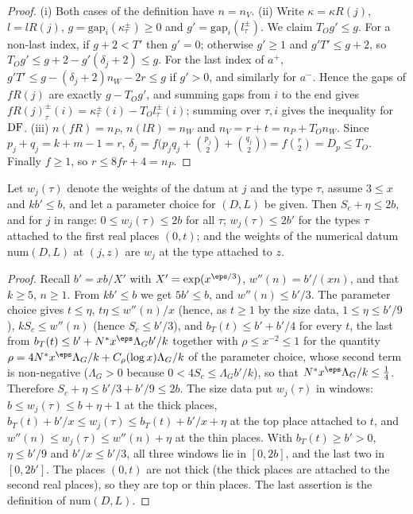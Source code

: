 \begin{proof}
(i) Both cases of the definition have $n=n_V$. (ii) Write $\kappa=\kappa R(j)$, $l=lR(j)$, $g=\mathrm{gap}_i(\kappa^\pm_\tau)
\ge0$ and $g'=\mathrm{gap}_i(l^\pm_\tau)$. We claim $T_Og'\le g$. For a non-last index, if $g+2<T'$ then $g'=0$;
otherwise $g'\ge1$ and $g'T'\le g+2$, so $T_Og'\le g+2-g'(\delta_j+2)\le g$. For the last index of $a^+$, $g'T'\le
g-(\delta_j+2)n_W-2r\le g$ if $g'>0$, and similarly for $a^-$. Hence the gaps of $fR(j)$ are exactly $g-T_Og'$, and
summing gaps from $i$ to the end gives $fR(j)^\pm_\tau(i)=\kappa^\pm_\tau(i)-T_Ol^\pm_\tau(i)$; summing over $\tau,i$
gives the inequality for $\operatorname{DF}$. (iii) $n(fR)=n_P$, $n(lR)=n_W$ and $n_V=r+t=n_P+T_On_W$. Since $p_j+q_j=k+m-1
=r$, $\delta_j=f\bigl(p_jq_j+\binom{p_j}2+\binom{q_j}2\bigr)=f\binom r2=D_p\le T_O$. Finally $f\ge1$, so $r\le8fr+4=n_P$.
\end{proof}

\begin{lemma}\label{pf:onto3:cloud}
Let $w_j(\tau)$ denote the weights of the datum at $j$ and the type $\tau$, assume $3\le x$ and $kb'\le b$, and let a
parameter choice for $(D,L)$ be given. Then $S_c+\eta\le2b$, and for $j$ in range: $0\le w_j(\tau)\le2b$ for all
$\tau$; $w_j(\tau)\le2b'$ for the types $\tau$ attached to the first real places $(0,t)$; and the weights of the
numerical datum $\mathrm{num}(D,L)$ at $(j,z)$ are $w_j$ at the type attached to $z$.
\end{lemma}

\begin{proof}
Recall $b'=xb/X'$ with $X'=\exp(x^{\eps/3})$, $w''(n)=b'/(xn)$, and that $k\ge5$, $n\ge1$. From $kb'\le b$ we get
$5b'\le b$, and $w''(n)\le b'/3$. The parameter choice gives $t\le\eta$, $t\eta\le w''(n)/x$ (hence, as $t\ge1$ by the
size data, $1\le\eta\le b'/9$), $kS_c\le w''(n)$ (hence $S_c\le b'/3$), and $b_T(t)\le b'+b'/4$ for every $t$, the last
from $b_T(t)\le b'+N^*x^{\eps}\Lambda_Gb'/k$ together with $\rho\le x^{-2}\le1$ for the quantity
$\rho=4N^*x^{\eps}\Lambda_G/k+C_\rho(\log x)\Lambda_G/k$ of the parameter choice, whose second term is non-negative
($\Lambda_G>0$ because $0<4S_c\le\Lambda_Gb'/k$), so that $N^*x^\eps\Lambda_G/k\le\frac14$. Therefore $S_c+\eta\le b'/3+b'/9\le2b$. The size data put $w_j(\tau)$ in windows: $b\le w_j(\tau)\le b+\eta+1$ at
the thick places, $b_T(t)+b'/x\le w_j(\tau)\le b_T(t)+b'/x+\eta$ at the top place attached to $t$, and $w''(n)\le
w_j(\tau)\le w''(n)+\eta$ at the thin places. With $b_T(t)\ge b'>0$, $\eta\le b'/9$ and $b'/x\le b'/3$, all three
windows lie in $[0,2b]$, and the last two in $[0,2b']$. The places $(0,t)$ are not thick (the thick places are attached
to the second real places), so they are top or thin places. The last assertion is the definition of $\mathrm{num}(D,L)$.
\end{proof}

